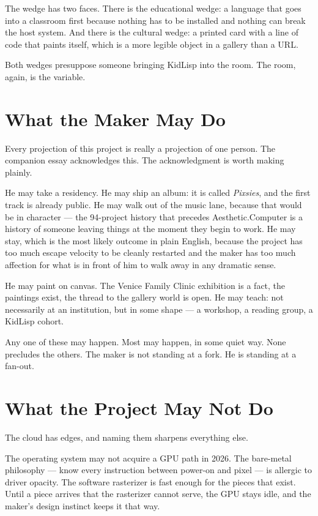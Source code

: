 \documentclass[11pt,letterpaper]{article}
\newcommand{\ac}{Aesthetic\textcolor{acpink}{.}Computer}
\begin{document}
The wedge has two faces. There is the educational wedge: a language that goes into a classroom first because nothing has to be installed and nothing can break the host system. And there is the cultural wedge: a printed card with a line of code that paints itself, which is a more legible object in a gallery than a URL.

Both wedges presuppose someone bringing KidLisp into the room. The room, again, is the variable.

\section{What the Maker May Do}

Every projection of this project is really a projection of one person. The companion essay acknowledges this. The acknowledgment is worth making plainly.

He may take a residency. He may ship an album: it is called \textit{Pixsies}, and the first track is already public. He may walk out of the music lane, because that would be in character --- the 94-project history that precedes \ac{} is a history of someone leaving things at the moment they begin to work. He may stay, which is the most likely outcome in plain English, because the project has too much escape velocity to be cleanly restarted and the maker has too much affection for what is in front of him to walk away in any dramatic sense.

He may paint on canvas. The Venice Family Clinic exhibition is a fact, the paintings exist, the thread to the gallery world is open. He may teach: not necessarily at an institution, but in some shape --- a workshop, a reading group, a KidLisp cohort.

Any one of these may happen. Most may happen, in some quiet way. None precludes the others. The maker is not standing at a fork. He is standing at a fan-out.

\section{What the Project May Not Do}

The cloud has edges, and naming them sharpens everything else.

The operating system may not acquire a GPU path in 2026. The bare-metal philosophy --- know every instruction between power-on and pixel --- is allergic to driver opacity. The software rasterizer is fast enough for the pieces that exist. Until a piece arrives that the rasterizer cannot serve, the GPU stays idle, and the maker's design instinct keeps it that way.
\end{document}
